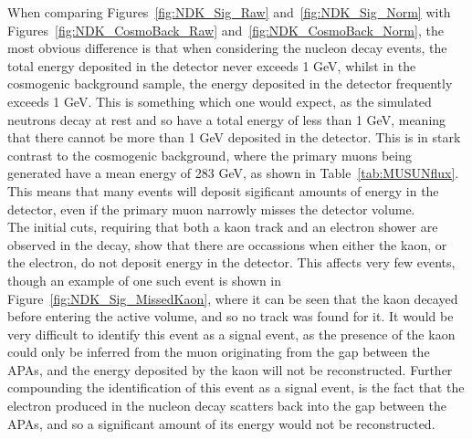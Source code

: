 When comparing Figures~\ref{fig:NDK_Sig_Raw} and~\ref{fig:NDK_Sig_Norm} with Figures~\ref{fig:NDK_CosmoBack_Raw} and~\ref{fig:NDK_CosmoBack_Norm}, the most obvious difference is that when considering the nucleon decay events, the total energy deposited in the detector never exceeds 1 GeV, whilst in the cosmogenic background sample, the energy deposited in the detector frequently exceeds 1 GeV. This is something which one would expect, as the simulated neutrons decay at rest and so have a total energy of less than 1 GeV, meaning that there cannot be more than 1 GeV deposited in the detector. This is in stark contrast to the cosmogenic background, where the primary muons being generated have a mean energy of 283 GeV, as shown in Table~\ref{tab:MUSUNflux}. This means that many events will deposit sigificant amounts of energy in the detector, even if the primary muon narrowly misses the detector volume. \\

The initial cuts, requiring that both a kaon track and an electron shower are observed in the decay, show that there are occassions when either the kaon, or the electron, do not deposit energy in the detector. This affects very few events, though an example of one such event is shown in Figure~\ref{fig:NDK_Sig_MissedKaon}, where it can be seen that the kaon decayed before entering the active volume, and so no track was found for it. It would be very difficult to identify this event as a signal event, as the presence of the kaon could only be inferred from the muon originating from the gap between the APAs, and the energy deposited by the kaon will not be reconstructed. Further compounding the identification of this event as a signal event, is the fact that the electron produced in the nucleon decay scatters back into the gap between the APAs, and so a significant amount of its energy would not be reconstructed. \\

